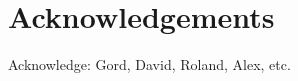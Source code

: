 

\tableofcontents                %


\listoffigures                  %




\chapter{Acknowledgements}      %
Acknowledge: Gord, David, Roland, Alex, etc.


